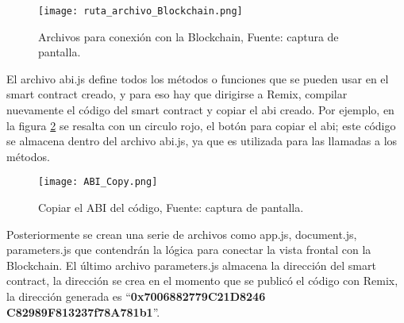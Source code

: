 \begin{figure}[H]
  \centering
  {\texttt{[image: ruta\_archivo\_Blockchain.png]}}
  \caption{Archivos para conexión con la Blockchain, Fuente: captura de pantalla. }
  \label{img:ruta_archivo_Blockchain}
\end{figure}
El archivo abi.js define todos los métodos o funciones que se pueden usar en el smart contract creado, y  para eso 
hay que dirigirse a Remix, compilar nuevamente el código del smart contract y copiar el \gls{abi} creado. Por ejemplo, 
en la figura \ref{img:abi_copy} se resalta con un circulo rojo, el botón para copiar el \gls{abi}; este código se almacena 
dentro del archivo abi.js, ya que es utilizada para  las llamadas a los métodos.

\begin{figure}[H]
  \centering
  {\texttt{[image: ABI\_Copy.png]}}
  \caption{Copiar el ABI del código, Fuente: captura de pantalla. }
  \label{img:abi_copy}
\end{figure}

Posteriormente se crean una serie de archivos como app.js, document.js, parameters.js que contendrán la lógica para conectar la vista frontal con la Blockchain.
El último archivo parameters.js almacena la dirección del smart contract, la dirección se crea en el momento que se publicó el código con Remix,
la dirección generada es “\textbf{0x7006882779C21D8246 C82989F813237f78A781b1}”.



